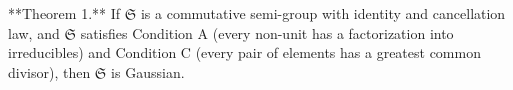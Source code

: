 **Theorem 1.** If $\mathfrak{S}$ is a commutative semi-group with identity and cancellation law, and $\mathfrak{S}$ satisfies Condition A (every non-unit has a factorization into irreducibles) and Condition C (every pair of elements has a greatest common divisor), then $\mathfrak{S}$ is Gaussian.
